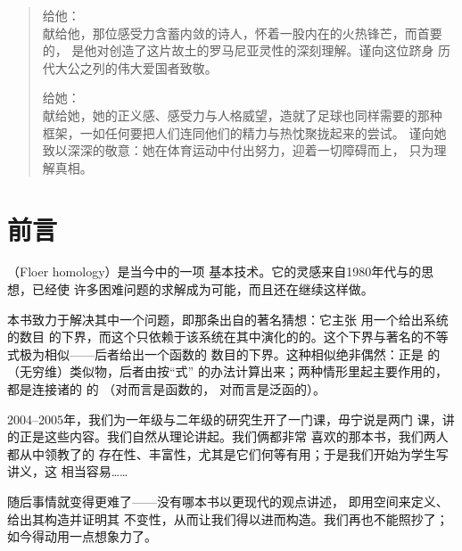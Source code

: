 
\thispagestyle{empty}
\vspace*{0.30\textheight}
\begin{quote}\kaishu
  给他：\\
  献给他，那位感受力含蓄内敛的诗人，怀着一股内在的火热锋芒，而首要的，
  是他对创造了这片故土的罗马尼亚灵性的深刻理解。谨向这位跻身
  历代大公之列的伟大爱国者致敬。

  给她：\\
  献给她，她的正义感、感受力与人格威望，造就了足球也同样需要的那种
  框架，一如任何要把人们连同他们的精力与热忱聚拢起来的尝试。
  谨向她致以深深的敬意：她在体育运动中付出努力，迎着一切障碍而上，
  只为理解真相。
\end{quote}
\clearpage

\chapter*{前言}
%
\setcounter{chapter}{0}%

\trFloerHomology{}（Floer homology）是当今\trSymplectic\trTopology{}中的一项
基本技术。它的灵感来自1980年代\trWitten{}与\trGromov{}的思想，已经使
许多困难问题的求解成为可能，而且还在继续这样做。

本书致力于解决其中一个问题，即那条出自\trArnold{}的著名猜想：它主张
用一个\trInvariant{}给出\trHamiltonian{}系统的\trPeriodic\trTrajectory{}数目
的下界，而这个\trInvariant{}只依赖于该系统在其中演化的\trSymplectic\trManifold{}的\trTopology。这个下界与著名的\trMorse{}不等式极为相似——后者给出一个函数的%
\trCriticalPoint{}数目的下界。这种相似绝非偶然：\trFloerHomology{}正是%
\trManifold\trHomology{}的（无穷维）类似物，后者由\trMorseComplex{}按“\trWitten{}式”
的办法计算出来；两种情形里起主要作用的，都是连接诸\trCriticalPoint{}的%
\trTrajectory{}的%
\trModuliSpace{}（对\trMorseHomology{}而言是函数的\trCriticalPoint，
对\trFloerHomology{}而言是泛函的\trCriticalPoint）。

2004--2005年，我们为一年级与二年级的研究生开了一门课，毋宁说是两门
课，讲的正是这些内容。我们自然从\trMorse{}理论讲起。我们俩都非常
喜欢\trMilnor{}的那本书，我们两人都从中领教了\trMorseFunction{}的
存在性、丰富性，尤其是它们何等有用；于是我们开始为学生写讲义，这
相当容易……

随后事情就变得更难了——没有哪本书以更现代的观点讲述\trMorseHomology，
即用\trTrajectory{}空间来定义\trMorseComplex{}、给出其构造并证明其
不变性，从而让我们得以进而构造\trFloerComplex{}。我们再也不能照抄了；
如今得动用一点想象力了。

